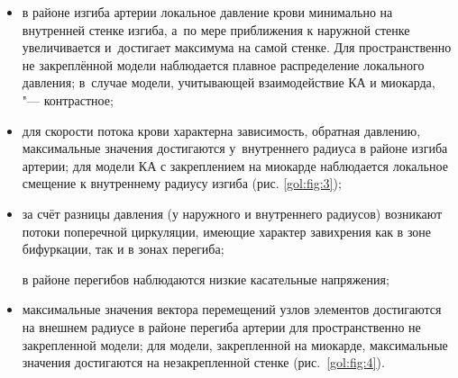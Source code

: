 \begin{itemize}

\item в районе изгиба артерии локальное давление крови минимально на внутренней стенке изгиба, а~по мере приближения к наружной стенке увеличивается и~достигает максимума на самой стенке. Для пространственно не закреплённой модели наблюдается плавное распределение локального давления; в~случае модели, учитывающей взаимодействие КА и миокарда, "--- контрастное; 

\item для скорости потока крови характерна зависимость, обратная давлению, максимальные значения достигаются у~внутреннего радиуса в районе изгиба артерии; для модели КА с закреплением на миокарде наблюдается локальное смещение к внутреннему радиусу изгиба (рис. \ref{gol:fig:3});

\item за счёт разницы давления (у наружного и внутреннего радиусов) возникают потоки поперечной циркуляции, имеющие характер завихрения как в зоне бифуркации,  так и в зонах перегиба;

в районе перегибов наблюдаются низкие касательные напряжения; 

\item максимальные значения вектора перемещений узлов элементов достигаются на внешнем радиусе в районе перегиба артерии для пространственно не закрепленной модели; для модели, закрепленной на миокарде, максимальные значения достигаются на незакрепленной стенке (рис.~\ref{gol:fig:4}).

\end{itemize}



